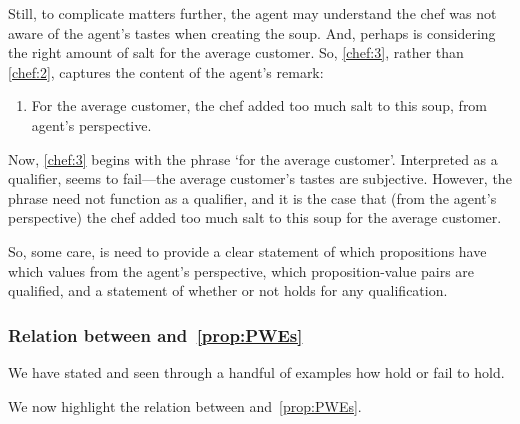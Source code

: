 \begin{note}
  Still, to complicate matters further, the agent may understand the chef was not aware of the agent's tastes when creating the soup.
  And, perhaps is considering the right amount of salt for the average customer.
  So, \ref{chef:3}, rather than \ref{chef:2}, captures the content of the agent's remark:

  \begin{enumerate}[label=\arabic*, ref=(\arabic*), resume]
  \item
    \label{chef:3}
    For the average customer, the chef added too much salt to this soup, from agent's perspective.
  \end{enumerate}

  Now, \ref{chef:3} begins with the phrase `for the average customer'.
  Interpreted as a qualifier, \ptivity{} seems to fail---the average customer's tastes are subjective.
  However, the phrase need not function as a qualifier, and it is the case that (from the agent's perspective) the chef added too much salt to this soup for the average customer.
\end{note}

\begin{note}
  So, some care, is need to provide a clear statement of which propositions have which values from the agent's perspective, which proposition-value pairs are qualified, and a statement of whether or not \ptivity{} holds for any qualification.
\end{note}

\subsubsection{Relation between \ptivity{} and~\autoref{prop:PWEs}}
\label{cha:zSpA:sec:ptivity-prop}

\begin{note}
  We have stated \ptivity{} and seen through a handful of examples how \ptivity{} hold or fail to hold.

  We now highlight the relation between \ptivity{} and~\autoref{prop:PWEs}.
\end{note}

